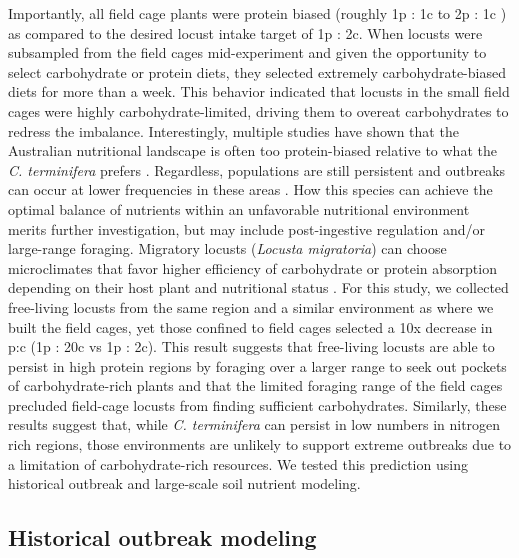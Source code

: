 \documentclass[
]{article}
\begin{document}
Importantly, all field cage plants were protein biased (roughly 1p : 1c
to 2p : 1c ) as compared to the desired locust intake target of 1p : 2c.
When locusts were subsampled from the field cages mid-experiment and
given the opportunity to select carbohydrate or protein diets, they
selected extremely carbohydrate-biased diets for more than a week. This
behavior indicated that locusts in the small field cages were highly
carbohydrate-limited, driving them to overeat carbohydrates to redress
the imbalance. Interestingly, multiple studies have shown that the
Australian nutritional landscape is often too protein-biased relative to
what the \emph{C. terminifera} prefers
\citep{lawton_woody_2020, lawton_mismatched_2021}. Regardless,
populations are still persistent and outbreaks can occur at lower
frequencies in these areas
\citep{deveson_satellite_2013, key_general_1945}. How this species can
achieve the optimal balance of nutrients within an unfavorable
nutritional environment merits further investigation, but may include
post-ingestive regulation and/or large-range foraging. Migratory locusts
(\emph{Locusta migratoria}) can choose microclimates that favor higher
efficiency of carbohydrate or protein absorption depending on their host
plant and nutritional status \citep{clissold_insect_2013}. For this
study, we collected free-living locusts from the same region and a
similar environment as where we built the field cages, yet those
confined to field cages selected a 10x decrease in p:c (1p : 20c vs 1p :
2c). This result suggests that free-living locusts are able to persist
in high protein regions by foraging over a larger range to seek out
pockets of carbohydrate-rich plants and that the limited foraging range
of the field cages precluded field-cage locusts from finding sufficient
carbohydrates. Similarly, these results suggest that, while \emph{C.
terminifera} can persist in low numbers in nitrogen rich regions, those
environments are unlikely to support extreme outbreaks due to a
limitation of carbohydrate-rich resources. We tested this prediction
using historical outbreak and large-scale soil nutrient modeling.

\subsection{Historical outbreak
modeling}\label{historical-outbreak-modeling}
\end{document}
